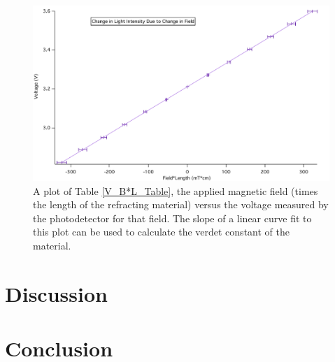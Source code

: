 \documentclass[prb,preprint]{revtex4-1}
\begin{document}
\begin{figure}[h!]
\centering
\includegraphics[width=5in]{V_B-L_Plot.pdf}
\caption{A plot of Table \ref{V_B*L_Table}, the applied magnetic field (times the length of the refracting material) versus the voltage measured by the photodetector for that field. The slope of a linear curve fit to this plot can be used to calculate the verdet constant of the material. }
\label{V_B*L_Plot}
\end{figure}

\section{Discussion}

\section{Conclusion}
\end{document}
